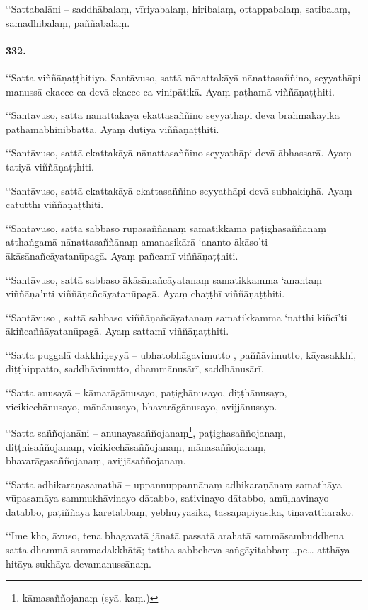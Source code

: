 ‘‘Sattabalāni – saddhābalaṃ, vīriyabalaṃ, hiribalaṃ, ottappabalaṃ, satibalaṃ, samādhibalaṃ, paññābalaṃ.

\paragraph{332.} ‘‘Satta viññāṇaṭṭhitiyo. Santāvuso, sattā nānattakāyā nānattasaññino, seyyathāpi manussā ekacce ca devā ekacce ca vinipātikā. Ayaṃ paṭhamā viññāṇaṭṭhiti.

‘‘Santāvuso, sattā nānattakāyā ekattasaññino seyyathāpi devā brahmakāyikā paṭhamābhinibbattā. Ayaṃ dutiyā viññāṇaṭṭhiti.

‘‘Santāvuso, sattā ekattakāyā nānattasaññino seyyathāpi devā ābhassarā. Ayaṃ tatiyā viññāṇaṭṭhiti.

‘‘Santāvuso, sattā ekattakāyā ekattasaññino seyyathāpi devā subhakiṇhā. Ayaṃ catutthī viññāṇaṭṭhiti.

‘‘Santāvuso, sattā sabbaso rūpasaññānaṃ samatikkamā paṭighasaññānaṃ atthaṅgamā nānattasaññānaṃ amanasikārā ‘ananto ākāso’ti ākāsānañcāyatanūpagā. Ayaṃ pañcamī viññāṇaṭṭhiti.

‘‘Santāvuso, sattā sabbaso ākāsānañcāyatanaṃ samatikkamma ‘anantaṃ viññāṇa’nti viññāṇañcāyatanūpagā. Ayaṃ chaṭṭhī viññāṇaṭṭhiti.

‘‘Santāvuso , sattā sabbaso viññāṇañcāyatanaṃ samatikkamma ‘natthi kiñcī’ti ākiñcaññāyatanūpagā. Ayaṃ sattamī viññāṇaṭṭhiti.

‘‘Satta puggalā dakkhiṇeyyā – ubhatobhāgavimutto , paññāvimutto, kāyasakkhi, diṭṭhippatto, saddhāvimutto, dhammānusārī, saddhānusārī.

‘‘Satta anusayā – kāmarāgānusayo, paṭighānusayo, diṭṭhānusayo, vicikicchānusayo, mānānusayo, bhavarāgānusayo, avijjānusayo.

‘‘Satta saññojanāni – anunayasaññojanaṃ\footnote{kāmasaññojanaṃ (syā. kaṃ.)}, paṭighasaññojanaṃ, diṭṭhisaññojanaṃ, vicikicchāsaññojanaṃ, mānasaññojanaṃ, bhavarāgasaññojanaṃ, avijjāsaññojanaṃ.

‘‘Satta adhikaraṇasamathā – uppannuppannānaṃ adhikaraṇānaṃ samathāya vūpasamāya sammukhāvinayo dātabbo, sativinayo dātabbo, amūḷhavinayo dātabbo, paṭiññāya kāretabbaṃ, yebhuyyasikā, tassapāpiyasikā, tiṇavatthārako.

‘‘Ime kho, āvuso, tena bhagavatā jānatā passatā arahatā sammāsambuddhena satta dhammā sammadakkhātā; tattha sabbeheva saṅgāyitabbaṃ…pe… atthāya hitāya sukhāya devamanussānaṃ.


